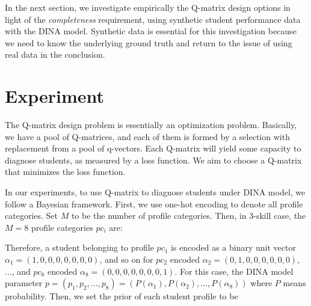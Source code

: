 \documentclass{edm_template}
\newcommand{\Michel}[1]{{\textcolor{purple}{[#1]}}}
\begin{document}
In the next section, we investigate empirically the Q-matrix design options in light of the \textit{completeness} requirement, using synthetic student performance data with the DINA model.  Synthetic data is essential for this investigation because we need to know the underlying ground truth and return to the issue of using real data in the conclusion.

\section{Experiment}
The Q-matrix design problem is essentially an optimization problem. Basically, we have a pool of Q-matrices, and each of them is formed by a selection with replacement from a pool of q-vectors. Each Q-matrix will yield some capacity to diagnose students, as measured by a loss function. We aim to choose a Q-matrix that minimizes the loss function.

In our experiments, to use Q-matrix to diagnose students under DINA model, we follow a Bayesian framework. First, we use one-hot encoding to denote all profile categories. Set $M$ to be the number of profile categories. Then, in 3-skill case, the $M=8$ profile categories $pc_i$ are:

\centerline{
}
Therefore, a student belonging to profile $pc_1$ is encoded as a binary unit vector $\alpha_1=(1,0,0,0,0,0,0,0)$, and so on for $pc_2$ encoded $\alpha_2=(0,1,0,0,0,0,0,0)$, ..., and $pc_8$ encoded $\alpha_8=(0,0,0,0,0,0,0,1)$.
For this case, the DINA model parameter $p = (p_1, p_2,..., p_8) = (P(\alpha_1), P(\alpha_2), ..., P(\alpha_8))$ where $P$ means probability.
Then, we set the prior of each student profile to be 
\end{document}
